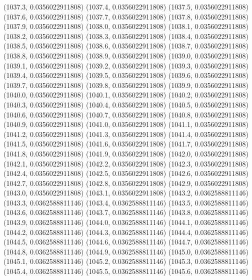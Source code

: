 {					(1037.3, 0.0356022911808)
					(1037.4, 0.0356022911808)
					(1037.5, 0.0356022911808)
					(1037.6, 0.0356022911808)
					(1037.7, 0.0356022911808)
					(1037.8, 0.0356022911808)
					(1037.9, 0.0356022911808)
					(1038.0, 0.0356022911808)
					(1038.1, 0.0356022911808)
					(1038.2, 0.0356022911808)
					(1038.3, 0.0356022911808)
					(1038.4, 0.0356022911808)
					(1038.5, 0.0356022911808)
					(1038.6, 0.0356022911808)
					(1038.7, 0.0356022911808)
					(1038.8, 0.0356022911808)
					(1038.9, 0.0356022911808)
					(1039.0, 0.0356022911808)
					(1039.1, 0.0356022911808)
					(1039.2, 0.0356022911808)
					(1039.3, 0.0356022911808)
					(1039.4, 0.0356022911808)
					(1039.5, 0.0356022911808)
					(1039.6, 0.0356022911808)
					(1039.7, 0.0356022911808)
					(1039.8, 0.0356022911808)
					(1039.9, 0.0356022911808)
					(1040.0, 0.0356022911808)
					(1040.1, 0.0356022911808)
					(1040.2, 0.0356022911808)
					(1040.3, 0.0356022911808)
					(1040.4, 0.0356022911808)
					(1040.5, 0.0356022911808)
					(1040.6, 0.0356022911808)
					(1040.7, 0.0356022911808)
					(1040.8, 0.0356022911808)
					(1040.9, 0.0356022911808)
					(1041.0, 0.0356022911808)
					(1041.1, 0.0356022911808)
					(1041.2, 0.0356022911808)
					(1041.3, 0.0356022911808)
					(1041.4, 0.0356022911808)
					(1041.5, 0.0356022911808)
					(1041.6, 0.0356022911808)
					(1041.7, 0.0356022911808)
					(1041.8, 0.0356022911808)
					(1041.9, 0.0356022911808)
					(1042.0, 0.0356022911808)
					(1042.1, 0.0356022911808)
					(1042.2, 0.0356022911808)
					(1042.3, 0.0356022911808)
					(1042.4, 0.0356022911808)
					(1042.5, 0.0356022911808)
					(1042.6, 0.0356022911808)
					(1042.7, 0.0356022911808)
					(1042.8, 0.0356022911808)
					(1042.9, 0.0356022911808)
					(1043.0, 0.0356022911808)
					(1043.1, 0.0356022911808)
					(1043.2, 0.0362588811146)
					(1043.3, 0.0362588811146)
					(1043.4, 0.0362588811146)
					(1043.5, 0.0362588811146)
					(1043.6, 0.0362588811146)
					(1043.7, 0.0362588811146)
					(1043.8, 0.0362588811146)
					(1043.9, 0.0362588811146)
					(1044.0, 0.0362588811146)
					(1044.1, 0.0362588811146)
					(1044.2, 0.0362588811146)
					(1044.3, 0.0362588811146)
					(1044.4, 0.0362588811146)
					(1044.5, 0.0362588811146)
					(1044.6, 0.0362588811146)
					(1044.7, 0.0362588811146)
					(1044.8, 0.0362588811146)
					(1044.9, 0.0362588811146)
					(1045.0, 0.0362588811146)
					(1045.1, 0.0362588811146)
					(1045.2, 0.0362588811146)
					(1045.3, 0.0362588811146)
					(1045.4, 0.0362588811146)
					(1045.5, 0.0362588811146)
					(1045.6, 0.0362588811146)
}

